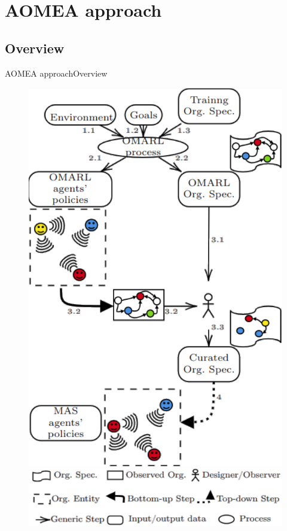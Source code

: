 \AtBeginSection[]{
    \begin{frame}
        \frametitle{}
        \tableofcontents[currentsection]
    \end{frame}
}


\section{AOMEA approach}

\subsection{Overview}

\begin{frame}{AOMEA approach}{Overview}

    \begin{figure}[h!]
        \centering
        \begin{minipage}{0.5\textwidth}
            \centering
            \vspace{-1.5ex}
            \includegraphics[width=0.7\linewidth]{figures/AOMEA_illustrative_global_view.png}
        \end{minipage}\hfill
        \begin{minipage}{0.5\textwidth}
            \centering
            \includegraphics[width=0.7\linewidth]{figures/AOMEA_global_view_legend.png}


\end{minipage}
\end{figure}
\end{frame}
